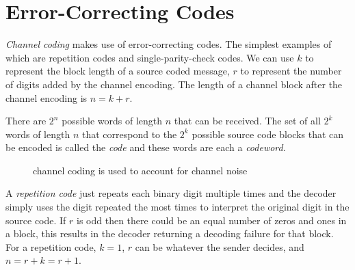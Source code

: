 \section{Error-Correcting Codes}

\textit{Channel coding} makes use of error-correcting codes. The simplest examples of which are repetition codes and single-parity-check codes. We can use $k$ to represent the block length of a source coded message, $r$ to represent the number of digits added by the channel encoding. The length of a channel block after the channel encoding is $n = k + r$.

There are $2^n$ possible words of length $n$ that can be received. The set of all $2^k$ words of length $n$ that correspond to the $2^k$ possible source code blocks that can be encoded is called the \textit{code} and these words are each a \textit{codeword}.

\begin{figure}
    \centering
    \caption{channel coding is used to account for channel noise}
    \label{fig:channelcodingpath}
\end{figure}

A \textit{repetition code} just repeats each binary digit multiple times and the decoder simply uses the digit repeated the most times to interpret the original digit in the source code. If $r$ is odd then there could be an equal number of zeros and ones in a block, this results in the decoder returning a decoding failure for that block. For a repetition code, $k = 1$, $r$ can be whatever the sender decides, and $n = r + k = r + 1$.

